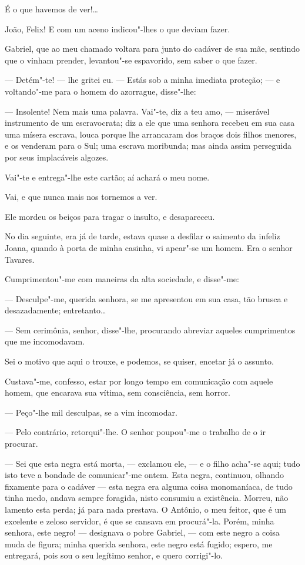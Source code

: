 É o que havemos de ver!\ldots{}

João, Felix! E com um aceno indicou"-lhes o que deviam fazer.

Gabriel, que ao meu chamado voltara para junto do cadáver de sua mãe,
sentindo que o vinham prender, levantou"-se espavorido, sem saber o que
fazer.

--- Detém"-te! --- lhe gritei eu. --- Estás sob a minha imediata proteção;
--- e voltando"-me para o homem do azorrague, disse"-lhe:

--- Insolente! Nem mais uma palavra. Vai"-te, diz a teu amo, --- miserável
instrumento de um escravocrata; diz a ele que uma senhora recebeu em sua
casa uma mísera escrava, louca porque lhe arrancaram dos braços dois
filhos menores, e os venderam para o Sul; uma escrava moribunda; mas
ainda assim perseguida por seus implacáveis algozes.

Vai"-te e entrega"-lhe este cartão; aí achará o meu nome.

Vai, e que nunca mais nos tornemos a ver.

Ele mordeu os beiços para tragar o insulto, e desapareceu.

No dia seguinte, era já de tarde, estava quase a desfilar o saimento da
infeliz Joana, quando à porta de minha casinha, vi apear"-se um homem.
Era o senhor Tavares.

Cumprimentou"-me com maneiras da alta sociedade, e disse"-me:

--- Desculpe"-me, querida senhora, se me apresentou em sua casa, tão
brusca e desazadamente; entretanto\ldots{}

--- Sem cerimônia, senhor, disse"-lhe, procurando abreviar aqueles
cumprimentos que me incomodavam.

Sei o motivo que aqui o trouxe, e podemos, se quiser, encetar já o
assunto.

Custava"-me, confesso, estar por longo tempo em comunicação com aquele
homem, que encarava sua vítima, sem consciência, sem horror.

--- Peço"-lhe mil desculpas, se a vim incomodar.

--- Pelo contrário, retorqui"-lhe. O senhor poupou"-me o trabalho de o ir
procurar.

--- Sei que esta negra está morta, --- exclamou ele, --- e o filho acha"-se
aqui; tudo isto teve a bondade de comunicar"-me ontem. Esta negra,
continuou, olhando fixamente para o cadáver --- esta negra era alguma
coisa monomaníaca, de tudo tinha medo, andava sempre foragida, nisto
consumiu a existência. Morreu, não lamento esta perda; já para nada
prestava. O Antônio, o meu feitor, que é um excelente e zeloso servidor,
é que se cansava em procurá"-la. Porém, minha senhora, este negro! ---
designava o pobre Gabriel, --- com este negro a coisa muda de figura;
minha querida senhora, este negro está fugido; espero, me entregará,
pois sou o seu legítimo senhor, e quero corrigi"-lo.

